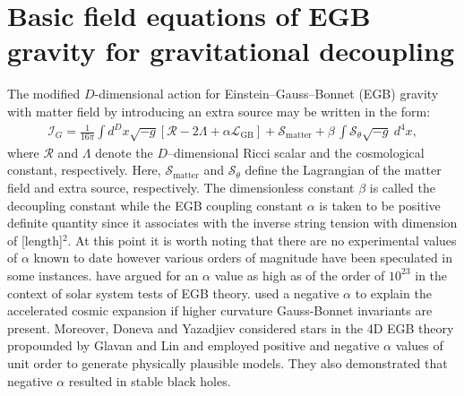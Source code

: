 \documentclass[]{aastex631}
\begin{document}
 \section{Basic field equations of EGB gravity for gravitational decoupling} \label{sec2}
The modified $D$-dimensional action for Einstein--Gauss--Bonnet (EGB) gravity with matter field by introducing an extra source may be written in the form: 
\begin{eqnarray}
	\mathcal{I}_{G}=\frac{1}{16 \pi }\int d^{D}x\sqrt{-g}\left[ \mathcal{R}-2\Lambda +\alpha \mathcal{L}_{\text{GB}} \right]+
\mathcal{S}_{\text{matter}}+\beta\,\int \mathcal{S}_{\theta}\sqrt{-g}~d^{4}x, \label{eq1}
\end{eqnarray}
where $\mathcal{R}$ and $\Lambda$ denote the $D$--dimensional Ricci scalar and the cosmological constant, respectively. Here, 
$\mathcal{S}_{\text{matter}}$ and $\mathcal{S}_{\theta}$ define the Lagrangian of the matter field and extra source, respectively. The dimensionless constant $\beta$ is called the decoupling constant while the EGB coupling constant $\alpha$ is taken to be positive definite quantity   since it associates with the inverse string tension with dimension of [$\text{length}$]$^2$.  At this point it is worth noting that there are no experimental values of $\alpha$ known to date however various orders of magnitude have been speculated in some instances.  \citep{amendola} have argued for an $\alpha$ value  as high as of the order of $10^{23}$ in the context of solar system tests of EGB theory.  \citep{dehghani} used a negative $\alpha$ to explain the accelerated cosmic expansion if higher curvature Gauss-Bonnet invariants are present. Moreover, Doneva and Yazadjiev \citep{doneva}  considered stars in the 4D EGB theory propounded by Glavan and Lin \citep{glavan} and employed positive and negative $\alpha$ values of unit order to generate physically plausible models. They also demonstrated that negative $\alpha$ resulted in stable black holes.  
\end{document}
